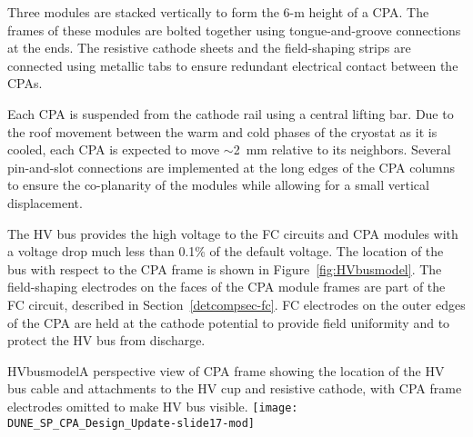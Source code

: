 Three modules are stacked vertically to form the 6-m height of a CPA. %
The frames of these modules are bolted together using tongue-and-groove connections at the ends. The resistive cathode sheets and the field-shaping strips are connected using metallic tabs to ensure redundant electrical contact between the CPAs. %


Each CPA is suspended from the cathode rail using a central lifting bar.  Due to the roof movement between the warm and cold phases of the cryostat as it is cooled, each CPA is expected to move $\sim$2~mm relative to its neighbors.  Several pin-and-slot connections are implemented at the long edges of the CPA columns to ensure the co-planarity of the modules while allowing for a small vertical displacement.  

The HV bus provides the high voltage to the FC
circuits and CPA modules with a voltage drop much less than 0.1\% of the
default voltage. The location of the bus with respect to the CPA frame is shown in Figure~\ref{fig:HVbusmodel}. The field-shaping electrodes on the faces of the CPA module
frames are part of the FC circuit, described in Section~\ref{detcompsec-fc}. 
FC electrodes on the outer edges of the
CPA are held at the cathode potential to provide field
uniformity and to protect the HV bus from discharge.  

\begin{cdrfigure}{HVbusmodel}{A perspective view of CPA frame showing the location of the HV bus cable and attachments to the HV cup and resistive cathode, with CPA frame electrodes omitted to make HV bus visible.}
\texttt{[image: DUNE\_SP\_CPA\_Design\_Update-slide17-mod]}
\end{cdrfigure}


